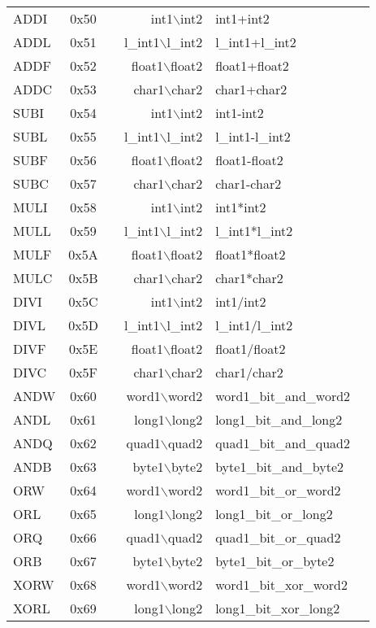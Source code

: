 \documentclass {article}
\begin{document}
\begin {tabular}{l|c|l|r@{--}l|l}
ADDI	& 0x50	& 		&int1$\backslash$int2&int1+int2\\
ADDL	& 0x51	& 		&l\_int1$\backslash$l\_int2&l\_int1+l\_int2\\
ADDF	& 0x52	& 		&float1$\backslash$float2&float1+float2\\
ADDC	& 0x53	& 		&char1$\backslash$char2&char1+char2\\
SUBI	& 0x54	& 		&int1$\backslash$int2&int1-int2\\
SUBL	& 0x55	& 		&l\_int1$\backslash$l\_int2&l\_int1-l\_int2\\
SUBF	& 0x56	& 		&float1$\backslash$float2&float1-float2\\
SUBC	& 0x57	& 		&char1$\backslash$char2&char1-char2\\
MULI	& 0x58	& 		&int1$\backslash$int2&int1*int2\\
MULL	& 0x59	& 		&l\_int1$\backslash$l\_int2&l\_int1*l\_int2\\
MULF	& 0x5A	& 		&float1$\backslash$float2&float1*float2\\
MULC	& 0x5B	& 		&char1$\backslash$char2&char1*char2\\
DIVI	& 0x5C	& 		&int1$\backslash$int2&int1/int2\\
DIVL	& 0x5D	& 		&l\_int1$\backslash$l\_int2&l\_int1/l\_int2\\
DIVF	& 0x5E	& 		&float1$\backslash$float2&float1/float2\\
DIVC	& 0x5F	& 		&char1$\backslash$char2&char1/char2\\
ANDW	& 0x60	& 		&word1$\backslash$word2&word1\_bit\_and\_word2\\
ANDL	& 0x61	& 		&long1$\backslash$long2&long1\_bit\_and\_long2\\
ANDQ	& 0x62	& 		&quad1$\backslash$quad2&quad1\_bit\_and\_quad2\\
ANDB	& 0x63	& 		&byte1$\backslash$byte2&byte1\_bit\_and\_byte2\\
ORW	& 0x64	& 		&word1$\backslash$word2&word1\_bit\_or\_word2\\
ORL	& 0x65	& 		&long1$\backslash$long2&long1\_bit\_or\_long2\\
ORQ	& 0x66	& 		&quad1$\backslash$quad2&quad1\_bit\_or\_quad2\\
ORB	& 0x67	& 		&byte1$\backslash$byte2&byte1\_bit\_or\_byte2\\
XORW	& 0x68	& 		&word1$\backslash$word2&word1\_bit\_xor\_word2\\
XORL	& 0x69	& 		&long1$\backslash$long2&long1\_bit\_xor\_long2\\

\end{tabular}
\end{document}
